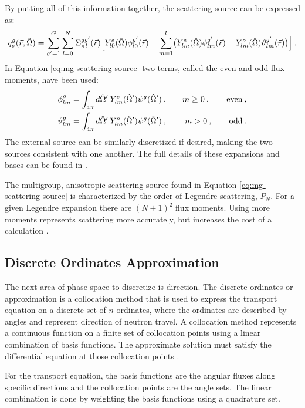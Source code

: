 By putting all of this information together, the scattering source can be expressed as: 
%
\begin{equation}
  q^g_{s} (\vec{r}, \hat{\Omega}) = \sum_{g'=1}^G \sum_{l=0}^N \Sigma^{gg'}_{s\,l}(\vec{r}) \Bigl[ Y^e_{l0}(\hat{\Omega}) \phi^{g'}_{l0}(\vec{r}) + \sum_{m=1}^l \bigl( Y^e_{lm}(\hat{\Omega}) \phi^{g'}_{lm}(\vec{r}) + Y^o_{lm}(\hat{\Omega}) \vartheta^{g'}_{lm}(\vec{r}) \bigr) \Bigr]\:.
   \label{eq:mg-scattering-source}
\end{equation}
%
In Equation \eqref{eq:mg-scattering-source} two terms, called the even and odd flux moments, have been used:
%
\begin{alignat}{3}
  \phi^g_{lm} &= \int_{4\pi} d\hat{\Omega}' \:Y^e_{lm}(\hat{\Omega}') \psi^g(\hat{\Omega}') \:, \quad& m\ge 0\:,\qquad \text{even} \:, \label{eq:even-flux}\\
  \vartheta^g_{lm} &= \int_{4\pi} d\hat{\Omega}' \:Y^o_{lm}(\hat{\Omega}')\psi^g(\hat{\Omega}') \:, \quad& m>0 \:,  \qquad \text{odd} \label{eq:odd-flux} \:.
\end{alignat}
%
The external source can be similarly discretized if desired, making the two sources consistent with one another. The full details of these expansions and bases can be found in \cite{Evans2009}. 

The multigroup, anisotropic scattering source found in Equation \eqref{eq:mg-scattering-source} is characterized by the order of Legendre scattering, $P_{N}$. For a given Legendre expansion there are $(N + 1)^{2}$ flux moments. Using more moments represents scattering more accurately, but increases the cost of a calculation \cite{Evans2009}.  

\subsection{Discrete Ordinates Approximation}
The next area of phase space to discretize is direction. The discrete ordinates or \Sn approximation is a collocation method that is used to express the transport equation on a discrete set of $n$ ordinates, where the ordinates are described by angles and represent direction of neutron travel. A collocation method represents a continuous function on a finite set of collocation points using a linear combination of basis functions. The approximate solution must satisfy the differential equation at those collocation points \cite{Heath2002}. 

For the transport equation, the basis functions are the angular fluxes along specific directions and the collocation points are the angle sets. The linear combination is done by weighting the basis functions using a quadrature set. 

